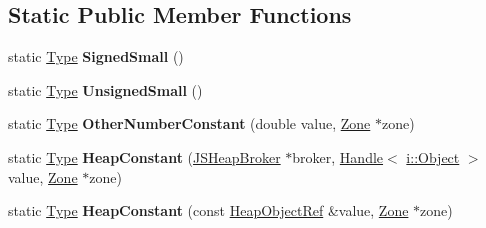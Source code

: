 \subsection*{Static Public Member Functions}
\begin{DoxyCompactItemize}
\item 
\mbox{\label{classv8_1_1internal_1_1compiler_1_1Type_a9c630b20a43511b8065736715a00eba0}} 
static \mbox{\hyperlink{classv8_1_1internal_1_1compiler_1_1Type}{Type}} {\bfseries Signed\+Small} ()
\item 
\mbox{\label{classv8_1_1internal_1_1compiler_1_1Type_a081a9bfcb3a51d9d09fdb784345a184d}} 
static \mbox{\hyperlink{classv8_1_1internal_1_1compiler_1_1Type}{Type}} {\bfseries Unsigned\+Small} ()
\item 
\mbox{\label{classv8_1_1internal_1_1compiler_1_1Type_aa0f1d7e5ef8644d64cff62aefe12cdb6}} 
static \mbox{\hyperlink{classv8_1_1internal_1_1compiler_1_1Type}{Type}} {\bfseries Other\+Number\+Constant} (double value, \mbox{\hyperlink{classv8_1_1internal_1_1Zone}{Zone}} $\ast$zone)
\item 
\mbox{\label{classv8_1_1internal_1_1compiler_1_1Type_ad5bb2b1ded716afe2247b1931ac5877f}} 
static \mbox{\hyperlink{classv8_1_1internal_1_1compiler_1_1Type}{Type}} {\bfseries Heap\+Constant} (\mbox{\hyperlink{classv8_1_1internal_1_1compiler_1_1JSHeapBroker}{J\+S\+Heap\+Broker}} $\ast$broker, \mbox{\hyperlink{classv8_1_1internal_1_1Handle}{Handle}}$<$ \mbox{\hyperlink{classv8_1_1internal_1_1Object}{i\+::\+Object}} $>$ value, \mbox{\hyperlink{classv8_1_1internal_1_1Zone}{Zone}} $\ast$zone)
\item 
\mbox{\label{classv8_1_1internal_1_1compiler_1_1Type_a72ee88d9d1037c71cd9a984b20136aaa}} 
static \mbox{\hyperlink{classv8_1_1internal_1_1compiler_1_1Type}{Type}} {\bfseries Heap\+Constant} (const \mbox{\hyperlink{classv8_1_1internal_1_1compiler_1_1HeapObjectRef}{Heap\+Object\+Ref}} \&value, \mbox{\hyperlink{classv8_1_1internal_1_1Zone}{Zone}} $\ast$zone)
\item 
\mbox{\label{classv8_1_1internal_1_1compiler_1_1Type_adaee9d1001df4272b7ea0947296a8800}} 

\end{DoxyCompactItemize}
